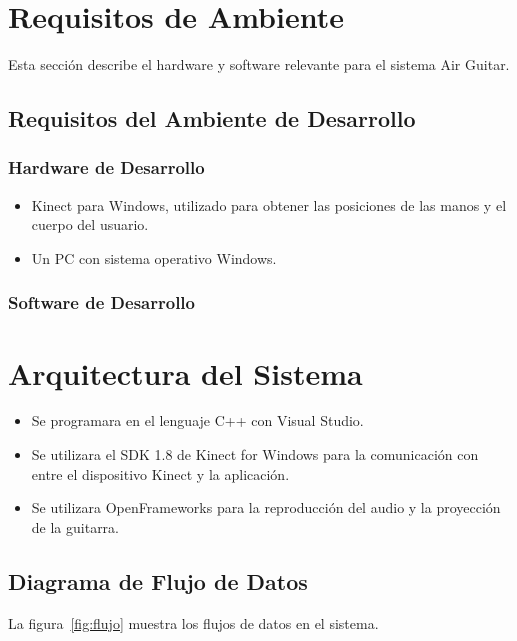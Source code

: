 \documentclass[a4paper,12pt]{article}
\begin{document}
\section{Requisitos de Ambiente}
Esta sección describe el hardware y software relevante para el sistema Air
Guitar.
\subsection{Requisitos del Ambiente de Desarrollo}
\subsubsection{Hardware de Desarrollo}

\begin{itemize}
	\item Kinect para Windows, utilizado para obtener las posiciones de las manos y el cuerpo del usuario.
	\item Un PC con sistema operativo Windows.
\end{itemize}

\subsubsection{Software de Desarrollo}

\section{Arquitectura del Sistema}

\begin{itemize}
	\item Se programara en el lenguaje C++ con Visual Studio.
	\item Se utilizara el SDK 1.8 de Kinect for Windows para la comunicación con entre el dispositivo Kinect y la aplicación. 
	\item Se utilizara OpenFrameworks para la reproducción del audio y la proyección de la guitarra.
\end{itemize}

\subsection{Diagrama de Flujo de Datos}

La figura~\ref{fig:flujo} muestra los flujos de datos en el sistema.
\end{document}
